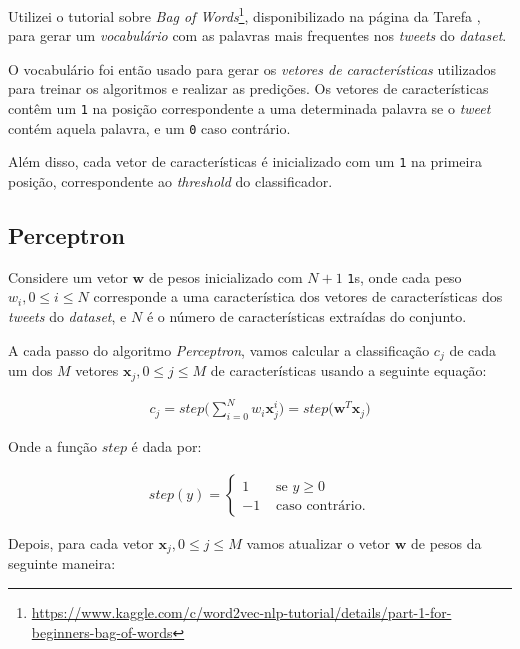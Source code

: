\documentclass[a4paper, 12pt]{article}
\newcommand{\rom}[1]{\uppercase\expandafter{\romannumeral #1\relax}}
\begin{document}
Utilizei o tutorial sobre \textit{Bag of
Words}\footnote{\url{https://www.kaggle.com/c/word2vec-nlp-tutorial/details/part-1-for-beginners-bag-of-words}},
disponibilizado na página da Tarefa \rom{1}, para gerar um \textit{vocabulário}
com as palavras mais frequentes nos \textit{tweets} do \textit{dataset}.

O vocabulário foi então usado para gerar os \textit{vetores de características}
utilizados para treinar os algoritmos e realizar as predições.
Os vetores de características contêm um \texttt{1} na posição
correspondente a uma determinada palavra se o \textit{tweet}
contém aquela palavra, e um \texttt{0} caso contrário.

Além disso, cada vetor de características é inicializado com
um \texttt{1} na primeira posição, correspondente ao
\textit{threshold} do classificador.

\subsection{Perceptron} \label{sec:percep}

Considere um vetor $\boldsymbol{w}$ de pesos inicializado com $N + 1$
\texttt{1}s, onde cada peso $w_i, 0 \leq i \leq N$ corresponde a uma
característica dos vetores de características dos \textit{tweets} do
\textit{dataset}, e $N$ é o número de características extraídas do conjunto.

A cada passo do algoritmo \textit{Perceptron}, vamos calcular a classificação
$c_j$ de cada um dos $M$ vetores $\boldsymbol{x}_j, 0 \leq j \leq M$ de características
usando a seguinte equação:

\begin{align*}
    c_j = step\bigg(\sum_{i = 0}^{N}{w_i\boldsymbol{x}_{j}^{i}}\bigg) = step\bigg(\boldsymbol{w}^{T}\boldsymbol{x}_j\bigg)
\end{align*}

Onde a função $step$ é dada por:

\begin{align*}
    step(y) = \begin{cases}
        1 & \text{ se } y \geq 0 \\
        -1 & \text{ caso contrário.}
    \end{cases}
\end{align*}

Depois, para cada vetor $\boldsymbol{x}_j, 0 \leq j \leq M$ vamos atualizar o vetor
$\boldsymbol{w}$ de pesos da seguinte maneira:
\end{document}
